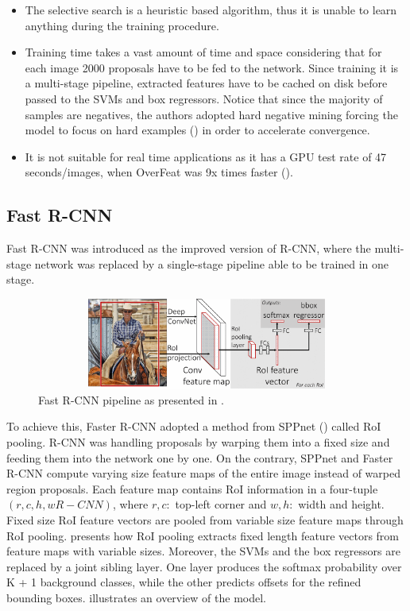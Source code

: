 \begin{itemize}
  \item The selective search is a heuristic based algorithm, thus it is unable to learn anything during the training procedure. 
  \item Training time takes a vast amount of time and space considering that for each image 2000 proposals have to be fed to the network. Since training it is a multi-stage pipeline, extracted features have to be cached on disk before passed to the SVMs and box regressors. Notice that since the majority of samples are negatives, the authors adopted hard negative mining forcing the model to focus on hard examples (\cite{felzenszwalb2009object}) in order to accelerate convergence.
  \item It is not suitable for real time applications as it has a GPU test rate of  47 seconds/images, when OverFeat was 9x times faster (\cite{girshick2015fast}). 
\end{itemize}

\subsection{Fast R-CNN}
Fast R-CNN was introduced as the improved version of R-CNN, where the multi-stage network was replaced by a single-stage pipeline able to be trained in one stage.

\begin{figure}[!htb]
  \centering
  \includegraphics[width=12cm, height=3cm]{images/ch2/fig3.png}
  \caption{Fast R-CNN pipeline as presented in \cite{girshick2015fast}.}
  \label{fig3}
\end{figure}

To achieve this, Faster R-CNN adopted a method from SPPnet (\cite{he2015spatial}) called RoI pooling. R-CNN was handling proposals by warping them into a fixed size and feeding them into the network one by one. On the contrary, SPPnet and Faster R-CNN compute varying size feature maps of the entire image instead of warped region proposals. Each feature map contains RoI information in a four-tuple $(r,c,h,wR-CNN)$, where $r, c:$ top-left corner and $w, h:$ width and height. Fixed size RoI feature vectors are pooled from variable size feature maps through RoI pooling.  presents how RoI pooling extracts fixed length feature vectors from feature maps with variable sizes. Moreover, the SVMs and the box regressors are replaced by a joint sibling layer. One layer produces the softmax probability over K + 1 background classes, while the other predicts offsets for the refined bounding boxes.  illustrates an overview of the model. 

